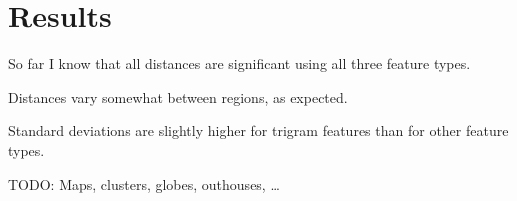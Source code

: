 \chapter{Results}

So far I know that all distances are significant using all three
feature types.

Distances vary somewhat between regions, as expected.

Standard deviations are slightly higher for trigram features than for
other feature types.

TODO: Maps, clusters, globes, outhouses, \ldots
